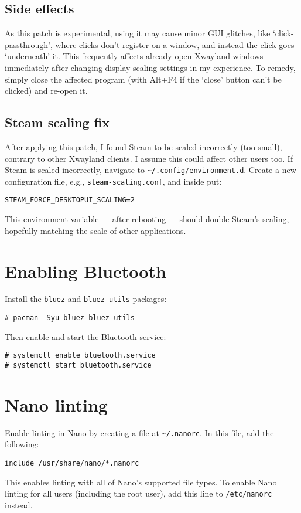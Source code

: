 \documentclass[a4paper]{article}
\begin{document}
\subsection{Side effects}

As this patch is experimental, using it may cause minor GUI glitches, like `click-passthrough', where clicks don't register on a window, and instead the click goes `underneath' it.
This frequently affects already-open Xwayland windows immediately after changing display scaling settings in my experience.
To remedy, simply close the affected program (with Alt+F4 if the `close' button can't be clicked) and re-open it.

\subsection{Steam scaling fix}

After applying this patch, I found Steam to be scaled incorrectly (too small), contrary to other Xwayland clients.
I assume this could affect other users too.
If Steam is scaled incorrectly, navigate to \lstinline|~/.config/environment.d|.
Create a new configuration file, e.g., \lstinline|steam-scaling.conf|, and inside put:
\begin{lstlisting}
STEAM_FORCE_DESKTOPUI_SCALING=2
\end{lstlisting}
This environment variable --- after rebooting --- should double Steam's scaling, hopefully matching the scale of other applications.


\section{Enabling Bluetooth}

Install the \lstinline|bluez| and \lstinline|bluez-utils| packages:
\begin{lstlisting}
# pacman -Syu bluez bluez-utils
\end{lstlisting}

Then enable and start the Bluetooth service:
\begin{lstlisting}
# systemctl enable bluetooth.service
# systemctl start bluetooth.service
\end{lstlisting}


\section{Nano linting}

Enable linting in Nano by creating a file at \lstinline|~/.nanorc|.
In this file, add the following:
\begin{lstlisting}
include /usr/share/nano/*.nanorc
\end{lstlisting}
This enables linting with all of Nano's supported file types.
To enable Nano linting for all users (including the root user), add this line to \lstinline|/etc/nanorc| instead.
\end{document}
